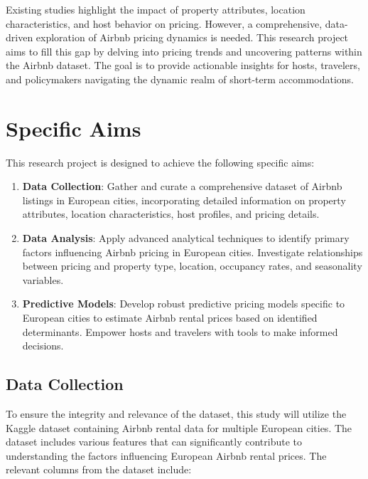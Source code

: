 \documentclass[12pt, letterpaper]{article}
\begin{document}
Existing studies highlight the impact of property attributes, location characteristics, and host behavior on pricing. However, a comprehensive, data-driven exploration of Airbnb pricing dynamics is needed. This research project aims to fill this gap by delving into pricing trends and uncovering patterns within the Airbnb dataset. The goal is to provide actionable insights for hosts, travelers, and policymakers navigating the dynamic realm of short-term accommodations.

\section*{Specific Aims}
This research project is designed to achieve the following specific aims:

\begin{enumerate}
  \item \textbf{Data Collection}: Gather and curate a comprehensive dataset of Airbnb listings in European cities, incorporating detailed information on property attributes, location characteristics, host profiles, and pricing details.
  \item \textbf{Data Analysis}: Apply advanced analytical techniques to identify primary factors influencing Airbnb pricing in European cities. Investigate relationships between pricing and property type, location, occupancy rates, and seasonality variables.
  \item \textbf{Predictive Models}: Develop robust predictive pricing models specific to European cities to estimate Airbnb rental prices based on identified determinants. Empower hosts and travelers with tools to make informed decisions.
\end{enumerate}

\subsection*{Data Collection}
To ensure the integrity and relevance of the dataset, this study will utilize the Kaggle dataset containing Airbnb rental data for multiple European cities. The dataset includes various features that can significantly contribute to understanding the factors influencing European Airbnb rental prices. The relevant columns from the dataset include:
\end{document}
